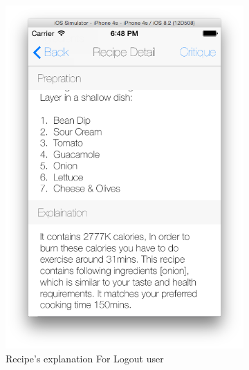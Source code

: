 \begin{figure}[h]
	\begin{subfigure}{.49\textwidth}
		\includegraphics[width=.9\linewidth]{figures/ch4_app_screen_shots/recipe_detail/recommended_recipe_explaination/recommended_recipe_explaination_2.png}
		\caption{Recipe's explanation For Logout user}
		\label{fig:foodforme_recipe_explanation_2}
	\end{subfigure}
	\begin{subfigure}{.49\textwidth}

\end{subfigure}
\end{figure}
